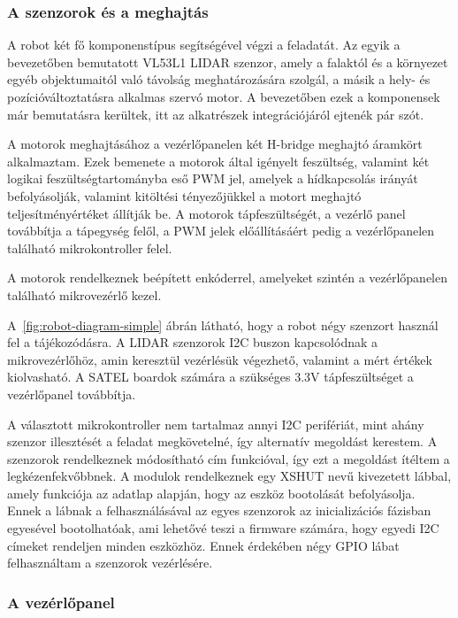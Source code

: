 \subsubsection{A szenzorok és a meghajtás}

A robot két fő komponenstípus segítségével végzi a feladatát. Az egyik a
bevezetőben bemutatott VL53L1 LIDAR szenzor, amely a falaktól és a környezet
egyéb objektumaitól való távolság meghatározására szolgál, a másik a hely- és
pozícióváltoztatásra alkalmas szervó motor. A bevezetőben ezek a komponensek már
bemutatásra kerültek, itt az alkatrészek integrációjáról ejtenék pár szót.

\medskip

A motorok meghajtásához a vezérlőpanelen két H-bridge meghajtó áramkört
alkalmaztam. Ezek bemenete a motorok által igényelt feszültség, valamint két
logikai feszültségtartományba eső PWM jel, amelyek a hídkapcsolás irányát
befolyásolják, valamint kitöltési tényezőjükkel a motort meghajtó
teljesítményértéket állítják be. A motorok tápfeszültségét, a vezérlő panel
továbbítja a tápegység felől, a PWM jelek előállításáért pedig a vezérlőpanelen
található mikrokontroller felel.

A motorok rendelkeznek beépített enkóderrel, amelyeket szintén a vezérlőpanelen
található mikrovezérlő kezel.

\medskip

A~\ref{fig:robot-diagram-simple} ábrán látható, hogy a robot négy szenzort
használ fel a tájékozódásra. A LIDAR szenzorok I2C buszon kapcsolódnak a
mikrovezérlőhöz, amin keresztül vezérlésük végezhető, valamint a mért értékek
kiolvasható. A SATEL boardok számára a szükséges 3.3V tápfeszültséget a
vezérlőpanel továbbítja.

A választott mikrokontroller nem tartalmaz annyi I2C perifériát, mint ahány
szenzor illesztését a feladat megkövetelné, így alternatív megoldást kerestem. A
szenzorok rendelkeznek módosítható cím funkcióval, így ezt a megoldást ítéltem a
legkézenfekvőbbnek. A modulok rendelkeznek egy XSHUT nevű kivezetett lábbal,
amely funkciója az adatlap alapján, hogy az eszköz bootolását befolyásolja. Ennek
a lábnak a felhasználásával az egyes szenzorok az inicializációs fázisban
egyesével bootolhatóak, ami lehetővé teszi a firmware számára, hogy egyedi I2C
címeket rendeljen minden eszközhöz. Ennek érdekében négy GPIO lábat felhasználtam
a szenzorok vezérlésére.

\subsubsection{A vezérlőpanel}

